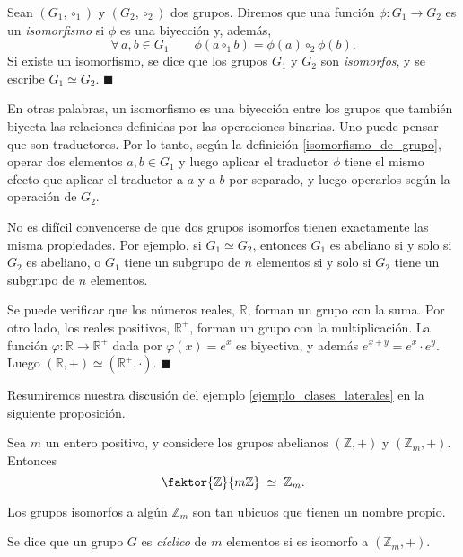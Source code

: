 \begin{definition}[Isomorfismo] \label{isomorfismo_de_grupo}
Sean $(G_1, \circ_1)$ y $(G_2, \circ_2)$ dos grupos. Diremos que una función $\phi\colon G_1 \rightarrow G_2$ es un \emph{isomorfismo} si $\phi$ es una biyección y, además,
$$\forall\, a, b \in G_1 \qquad \phi(a \circ_1 b) = \phi(a) \circ_2 \phi(b).$$
Si existe un isomorfismo, se dice que los grupos $G_1$ y $G_2$ son \emph{isomorfos}, y se escribe $G_1 \simeq G_2$. \hfill$\blacksquare$
\end{definition}

En otras palabras, un isomorfismo es una biyección entre los grupos que también biyecta las relaciones definidas por las operaciones binarias. Uno puede pensar que son traductores. Por lo tanto, según la definición \ref{isomorfismo_de_grupo}, operar dos elementos $a, b \in G_1$ y luego aplicar el traductor $\phi$ tiene el mismo efecto que aplicar el traductor a $a$ y a $b$ por separado, y luego operarlos según la operación de $G_2$.

No es difícil convencerse de que dos grupos isomorfos tienen exactamente las misma propiedades. Por ejemplo, si $G_1 \simeq G_2$, entonces $G_1$ es abeliano si y solo si $G_2$ es abeliano, o $G_1$ tiene un subgrupo de $n$ elementos si y solo si $G_2$ tiene un subgrupo de $n$ elementos.


\begin{example} \label{ejemplo_exponencial}
Se puede verificar que los números reales, $\mathbb{R}$, forman un grupo con la suma. Por otro lado, los reales positivos, $\mathbb{R}^{+}$, forman un grupo con la multiplicación. La función $\varphi\colon \mathbb{R} \rightarrow \mathbb{R}^{+}$ dada por $\varphi(x) = e^x$ es biyectiva, y además $e^{x+y} = e^x \cdot e^y$. Luego $(\mathbb{R}, +) \simeq (\mathbb{R}^{+}, \cdot)$. \hfill$\blacksquare$
\end{example}

Resumiremos nuestra discusión del ejemplo \ref{ejemplo_clases_laterales} en la siguiente proposición.

\begin{prop}
Sea $m$ un entero positivo, y considere los grupos abelianos $(\mathbb{Z}, +)$ y $(\mathbb{Z}_m, +)$. Entonces $$\faktor{\mathbb{Z}}{m \mathbb{Z}} \; \simeq \; \mathbb{Z}_m.$$
\end{prop}

Los grupos isomorfos a algún $\mathbb{Z}_m$ son tan ubicuos que tienen un nombre propio.

\begin{definition}
Se dice que un grupo $G$ es \emph{cíclico} de $m$ elementos si es isomorfo a $(\mathbb{Z}_m, +)$.
\end{definition}


